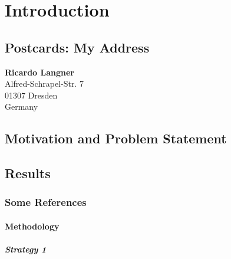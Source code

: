 %
\chapter{Introduction}
\label{sec:intro}


\Blindtext[2][2]

\section{Postcards: My Address}
\label{sec:intro:address}

\textbf{Ricardo Langner} \\
Alfred-Schrapel-Str. 7 \\
01307 Dresden \\
Germany


\section{Motivation and Problem Statement}
\label{sec:intro:motivation}

\Blindtext[3][1] \cite{Jurgens:2000,Jurgens:1995,Miede:2011,Kohm:2011,Apple:keynote:2010,Apple:numbers:2010,Apple:pages:2010}

\section{Results}
\label{sec:intro:results}

\Blindtext[1][2]

\subsection{Some References}
\label{sec:intro:results:refs}

\cite{WEB:GNU:GPL:2010,WEB:Miede:2011}
\Blindtext[1][1]

\subsubsection{Methodology}
\label{sec:intro:results:refs:method}

\Blindtext[1][2]

\paragraph{Strategy 1}
\Blindtext[1][1]

